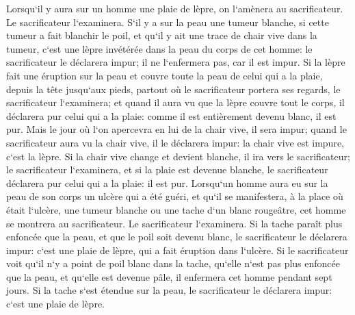\verse Lorsqu`il y aura sur un homme une plaie de lèpre, on l`amènera au sacrificateur. 
\verse Le sacrificateur l`examinera. S`il y a sur la peau une tumeur blanche, si cette tumeur a fait blanchir le poil, et qu`il y ait une trace de chair vive dans la tumeur, 
\verse c`est une lèpre invétérée dans la peau du corps de cet homme: le sacrificateur le déclarera impur; il ne l`enfermera pas, car il est impur. 
\verse Si la lèpre fait une éruption sur la peau et couvre toute la peau de celui qui a la plaie, depuis la tête jusqu`aux pieds, partout où le sacrificateur portera ses regards, le sacrificateur l`examinera; 
\verse et quand il aura vu que la lèpre couvre tout le corps, il déclarera pur celui qui a la plaie: comme il est entièrement devenu blanc, il est pur. 
\verse Mais le jour où l`on apercevra en lui de la chair vive, il sera impur; 
\verse quand le sacrificateur aura vu la chair vive, il le déclarera impur: la chair vive est impure, c`est la lèpre. 
\verse Si la chair vive change et devient blanche, il ira vers le sacrificateur; 
\verse le sacrificateur l`examinera, et si la plaie est devenue blanche, le sacrificateur déclarera pur celui qui a la plaie: il est pur. 
\verse Lorsqu`un homme aura eu sur la peau de son corps un ulcère qui a été guéri, 
\verse et qu`il se manifestera, à la place où était l`ulcère, une tumeur blanche ou une tache d`un blanc rougeâtre, cet homme se montrera au sacrificateur. 
\verse Le sacrificateur l`examinera. Si la tache paraît plus enfoncée que la peau, et que le poil soit devenu blanc, le sacrificateur le déclarera impur: c`est une plaie de lèpre, qui a fait éruption dans l`ulcère. 
\verse Si le sacrificateur voit qu`il n`y a point de poil blanc dans la tache, qu`elle n`est pas plus enfoncée que la peau, et qu`elle est devenue pâle, il enfermera cet homme pendant sept jours. 
\verse Si la tache s`est étendue sur la peau, le sacrificateur le déclarera impur: c`est une plaie de lèpre. 

